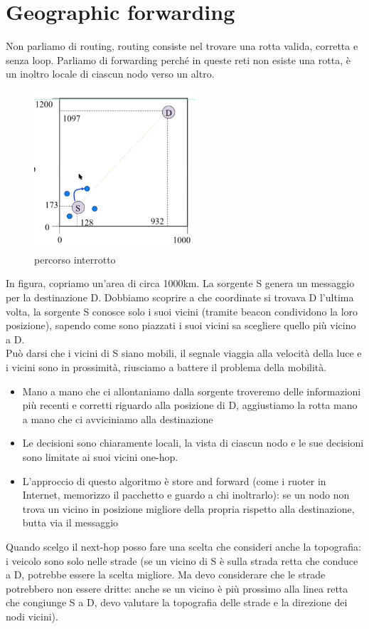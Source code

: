 \documentclass[12pt,italian]{report}
\begin{document}
\section{Geographic forwarding}
Non parliamo di routing, routing consiste nel trovare una rotta valida, corretta e senza loop. Parliamo di forwarding perché in queste reti non esiste una rotta, è un inoltro locale di ciascun nodo verso un altro.
\begin{figure}[h]
\centering
\includegraphics[width=60mm]{img/geofor.PNG}
\caption{percorso interrotto}
\label{fig:geofor}
\end{figure}
\bigbreak
In figura, copriamo un'area di circa 1000km. La sorgente S genera un messaggio per la destinazione D. Dobbiamo scoprire a che coordinate si trovava D l'ultima volta, la sorgente S conosce solo i suoi vicini (tramite beacon condividono la loro posizione), sapendo come sono piazzati i suoi vicini sa scegliere quello più vicino a D. \\ Può darsi che i vicini di S siano mobili, il segnale viaggia alla velocità della luce e i vicini sono in prossimità, riusciamo a battere il problema della mobilità. 
\begin{itemize}
    \item Mano a mano che ci allontaniamo dalla sorgente troveremo delle informazioni più recenti e corretti riguardo alla posizione di D, aggiustiamo la rotta mano a mano che ci avviciniamo alla destinazione
    \item  Le decisioni sono chiaramente locali, la vista di ciascun nodo e le sue decisioni sono limitate ai suoi vicini one-hop.
    \item L'approccio di questo algoritmo è store and forward (come i ruoter in Internet, memorizzo il pacchetto e guardo a chi inoltrarlo): se un nodo non trova un vicino in posizione migliore della propria rispetto alla destinazione, butta via il messaggio
\end{itemize}
Quando scelgo il next-hop posso fare una scelta che consideri anche la topografia: i veicolo sono solo nelle strade (se un vicino di S è sulla strada retta che conduce a D, potrebbe essere la scelta migliore. Ma devo considerare che le strade potrebbero non essere dritte: anche se un vicino è più prossimo alla linea retta che congiunge S a D, devo valutare la topografia delle strade e la direzione dei nodi vicini). 
\end{document}
